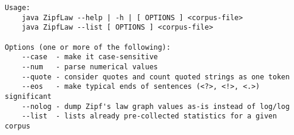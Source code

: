 \begin{verbatim}
Usage:
    java ZipfLaw --help | -h | [ OPTIONS ] <corpus-file>
    java ZipfLaw --list [ OPTIONS ] <corpus-file>

Options (one or more of the following):
    --case  - make it case-sensitive
    --num   - parse numerical values
    --quote - consider quotes and count quoted strings as one token
    --eos   - make typical ends of sentences (<?>, <!>, <.>) significant
    --nolog - dump Zipf's law graph values as-is instead of log/log
    --list  - lists already pre-collected statistics for a given corpus

\end{verbatim}
